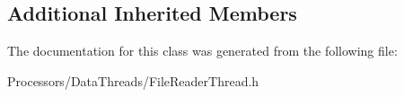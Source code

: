\subsection*{Additional Inherited Members}


The documentation for this class was generated from the following file\-:\begin{DoxyCompactItemize}
\item 
Processors/\-Data\-Threads/File\-Reader\-Thread.\-h\end{DoxyCompactItemize}
